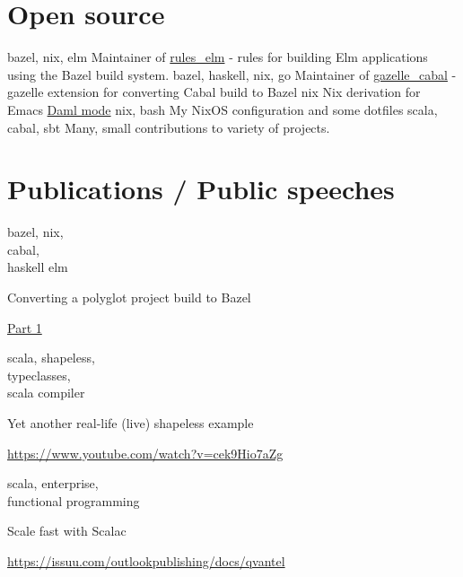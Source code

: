 \documentclass[a4paper,11pt]{cv4tw}%
\begin{document}
\section{Open source}
      {bazel, nix, elm}
      {Maintainer of \href{https://github.com/kczulko/rules\_elm}{rules\_elm} - rules for building Elm applications using the Bazel build system.
      }
      {bazel, haskell, nix, go}
      {Maintainer of \href{https://github.com/tweag/gazelle\_cabal}{gazelle\_cabal} - gazelle extension for converting Cabal build to Bazel
      }
      {nix}
      {Nix derivation for Emacs \href{https://github.com/digital-asset/daml}{Daml mode}
      }
      {nix, bash}
      {My NixOS configuration and some dotfiles
      }
      {scala, cabal, sbt}
      {Many, small contributions to variety of projects.
      }

\section{Publications / Public speeches}
      {bazel, nix,\\cabal,\\haskell elm}
      {Converting a polyglot project build to Bazel
        \begin{missions}
          \item \href{https://www.tweag.io/blog/2022-10-20-bazel-example-servant-elm-1/}{Part 1}
        \end{missions}
      }
      {scala, shapeless,\\typeclasses,\\scala compiler}
      {Yet another real-life (live) shapeless example
        \begin{missions}
          \item \href{https://www.youtube.com/watch?v=cek9Hio7aZg}{https://www.youtube.com/watch?v=cek9Hio7aZg}
        \end{missions}
      }
      {scala, enterprise,\\functional programming}
      {Scale fast with Scalac
        \begin{missions}
          \item \href{https://issuu.com/outlookpublishing/docs/qvantel}{https://issuu.com/outlookpublishing/docs/qvantel}
        \end{missions}
      }
\end{document}
